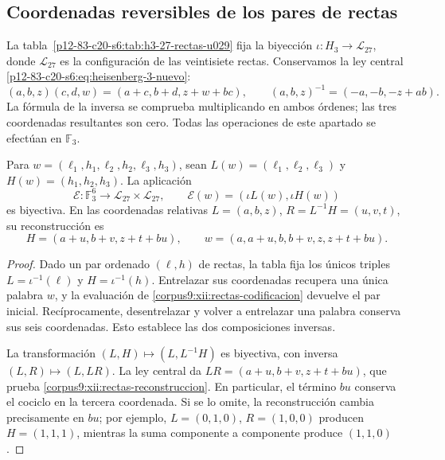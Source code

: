 \subsection{Coordenadas reversibles de los pares de rectas}
\label{corpus9:xii:rectas-coordenadas}

La tabla~\ref{p12-83-c20-s6:tab:h3-27-rectas-u029} fija la biyección
\(\iota:H_3\to\mathscr L_{27}\), donde \(\mathscr L_{27}\) es la
configuración de las veintisiete rectas. Conservamos la ley central
\eqref{p12-83-c20-s6:eq:heisenberg-3-nuevo}:
\[
 (a,b,z)(c,d,w)=(a+c,b+d,z+w+bc),\qquad
 (a,b,z)^{-1}=(-a,-b,-z+ab).
\]
La fórmula de la inversa se comprueba multiplicando en ambos órdenes;
las tres coordenadas resultantes son cero. Todas las operaciones de este
apartado se efectúan en \(\mathbb F_3\).

\begin{proposition}
\label{corpus9:xii:rectas-biyeccion}
Para \(w=(\ell_1,h_1,\ell_2,h_2,\ell_3,h_3)\), sean
\(L(w)=(\ell_1,\ell_2,\ell_3)\) y
\(H(w)=(h_1,h_2,h_3)\). La aplicación
\begin{equation}
 \mathcal E:\mathbb F_3^6\longrightarrow
                 \mathscr L_{27}\times\mathscr L_{27},\qquad
 \mathcal E(w)=(\iota L(w),\iota H(w))
 \label{corpus9:xii:rectas-codificacion}
\end{equation}
es biyectiva. En las coordenadas relativas
\(L=(a,b,z)\), \(R=L^{-1}H=(u,v,t)\), su reconstrucción es
\begin{equation}
 H=(a+u,b+v,z+t+bu),\qquad
 w=(a,a+u,b,b+v,z,z+t+bu).
 \label{corpus9:xii:rectas-reconstruccion}
\end{equation}
\end{proposition}
\begin{proof}
Dado un par ordenado \((\ell,h)\) de rectas, la tabla fija los
únicos triples \(L=\iota^{-1}(\ell)\) y
\(H=\iota^{-1}(h)\). Entrelazar sus coordenadas recupera una única
palabra \(w\), y la evaluación de
\eqref{corpus9:xii:rectas-codificacion} devuelve el par inicial.
Recíprocamente, desentrelazar y volver a entrelazar una palabra conserva
sus seis coordenadas. Esto establece las dos composiciones inversas.

La transformación \((L,H)\mapsto(L,L^{-1}H)\) es biyectiva, con
inversa \((L,R)\mapsto(L,LR)\). La ley central da
\(LR=(a+u,b+v,z+t+bu)\), que prueba
\eqref{corpus9:xii:rectas-reconstruccion}. En particular, el término
\(bu\) conserva el cociclo en la tercera coordenada. Si se lo omite,
la reconstrucción cambia precisamente en \(bu\); por ejemplo,
\(L=(0,1,0)\), \(R=(1,0,0)\) producen
\(H=(1,1,1)\), mientras la suma componente a componente produce
\((1,1,0)\).
\end{proof}

